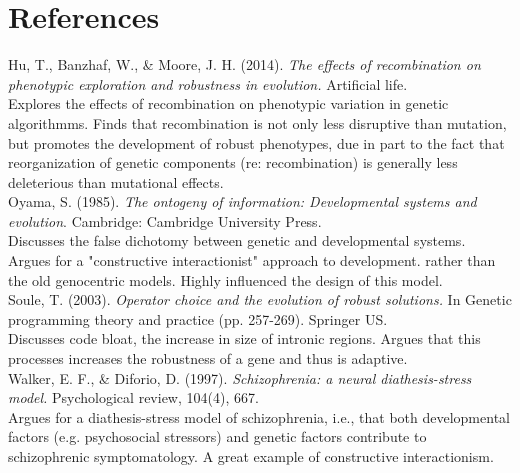 \documentclass[11pt]{article}
\begin{document}
\section*{References}
\label{sec:orgheadline1}
Hu, T., Banzhaf, W., \& Moore, J. H. (2014). \emph{The effects of recombination on phenotypic exploration and robustness in evolution.} Artificial life.\\
\indent Explores the effects of recombination on phenotypic variation in genetic algorithmms. Finds that recombination is not only less disruptive than mutation,
but promotes the development of robust phenotypes, due in part to the fact that reorganization of genetic components (re: recombination) is generally
less deleterious than mutational effects.\\
Oyama, S. (1985). \emph{The ontogeny of information: Developmental systems and evolution}. Cambridge: Cambridge University Press.\\
\indent Discusses the false dichotomy between genetic and developmental systems. Argues for a "constructive interactionist" approach to development.
rather than the old genocentric models. Highly influenced the design of this model. \\
Soule, T. (2003). \emph{Operator choice and the evolution of robust solutions.} In Genetic programming theory and practice (pp. 257-269). Springer US.\\
\indent Discusses code bloat, the increase in size of intronic regions. Argues that this processes increases the robustness of a
gene and thus is adaptive.\\
Walker, E. F., \& Diforio, D. (1997). \emph{Schizophrenia: a neural diathesis-stress model.} Psychological review, 104(4), 667. \\
\indent Argues for a diathesis-stress model of schizophrenia, i.e., that both developmental factors (e.g. psychosocial stressors) and 
genetic factors contribute to schizophrenic symptomatology. A great example of constructive interactionism.\\
\end{document}
